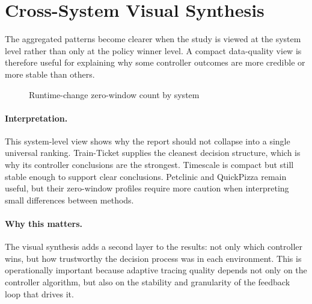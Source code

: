 \documentclass[10pt,twocolumn]{article}
\begin{document}
\section{Cross-System Visual Synthesis}
The aggregated patterns become clearer when the study is viewed at the system level rather than only at the policy winner level. A compact data-quality view is therefore useful for explaining why some controller outcomes are more credible or more stable than others.


\begin{figure}[t]
\centering
{}
\caption{Runtime-change zero-window count by system}
\end{figure}


\paragraph{Interpretation.} This system-level view shows why the report should not collapse into a single universal ranking. Train-Ticket supplies the cleanest decision structure, which is why its controller conclusions are the strongest. Timescale is compact but still stable enough to support clear conclusions. Petclinic and QuickPizza remain useful, but their zero-window profiles require more caution when interpreting small differences between methods.

\paragraph{Why this matters.} The visual synthesis adds a second layer to the results: not only which controller wins, but how trustworthy the decision process was in each environment. This is operationally important because adaptive tracing quality depends not only on the controller algorithm, but also on the stability and granularity of the feedback loop that drives it.
\FloatBarrier
\end{document}
